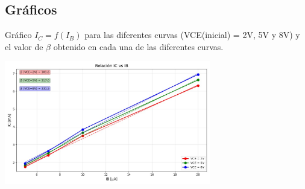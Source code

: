 \subsection{Gráficos}

Gráfico $I_C = f(I_B)$ para las diferentes curvas (VCE(inicial) = 2V, 5V y 8V) y el valor de $\beta$ obtenido en cada una de las diferentes curvas.

\includegraphics[width=9cm]{./imagenes/Grafico4.jpg}
